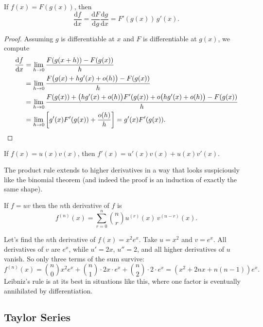 \documentclass[a4paper]{scrartcl}
\begin{document}
\begin{theorem}
	If $f(x) = F(g(x))$, then
	$$
	\frac{\mathrm{d}f}{\mathrm{d}x} = \frac{\mathrm{d}F}{\mathrm{d}g} \frac{\mathrm{d}g}{\mathrm{d}x} = F'(g(x)) \, g'(x).
	$$
\end{theorem}
\begin{proof}
	Assuming $g$ is differentiable at $x$ and $F$ is differentiable at $g(x)$, we compute
	\begin{align*}
		\frac{\mathrm{d}f}{\mathrm{d}x} &= \lim_{h \to 0} \frac{F(g(x + h)) - F(g(x))}{h} \\
		&= \lim_{h \to 0} \frac{F\big(g(x) + h g'(x) + o(h)\big) - F(g(x))}{h} \\
		&= \lim_{h \to 0} \frac{F(g(x)) + \big(hg'(x) + o(h)\big) F'(g(x)) + o\big(hg'(x) + o(h)\big) - F(g(x))}{h} \\
		&= \lim_{h \to 0} \left[ g'(x) F'(g(x)) + \frac{o(h)}{h} \right] = g'(x)F'(g(x)). \qedhere
	\end{align*}
\end{proof}

\begin{theorem}
	If $f(x) = u(x) v(x)$, then $f'(x) = u'(x) v(x) + u(x) v'(x)$.
\end{theorem}

The product rule extends to higher derivatives in a way that looks suspiciously like the binomial theorem (and indeed the proof is an induction of exactly the same shape).

\begin{theorem}
	If $f = uv$ then the $n$th derivative of $f$ is
	$$
	f^{(n)}(x) = \sum_{r = 0}^{n} \binom{n}{r} u^{(r)}(x)\, v^{(n - r)}(x).
	$$
\end{theorem}

\begin{example}
	Let's find the $n$th derivative of $f(x) = x^2 e^x$. Take $u = x^2$ and $v = e^x$. All derivatives of $v$ are $e^x$, while $u' = 2x$, $u'' = 2$, and all higher derivatives of $u$ vanish. So only three terms of the sum survive:
	$$
	f^{(n)}(x) = \binom{n}{0}x^2 e^x + \binom{n}{1} \cdot 2x \cdot e^x + \binom{n}{2}\cdot 2 \cdot e^x = \left(x^2 + 2nx + n(n-1)\right)e^x.
	$$
	Leibniz's rule is at its best in situations like this, where one factor is eventually annihilated by differentiation.
\end{example}

\subsection{Taylor Series}
\end{document}
